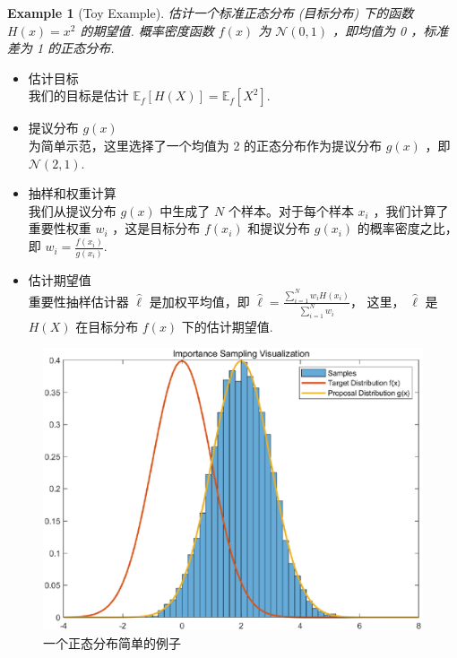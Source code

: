 \documentclass[UTF8,12pt,twoside]{ctexart}
\numberwithin{equation}{section}%
\newtheorem{example}{Example}[section]
\begin{document}
	
	\begin{example}[Toy Example]
		估计一个标准正态分布 (目标分布) 下的函数 $H(x)=x^2$ 的期望值. 概率密度函数 $f(x)$ 为 $\mathcal{N}(0,1)$ ，即均值为 0 ，标准差为 1 的正态分布. 
	\end{example}
	
	
	\begin{itemize}[itemsep=10pt, parsep=5pt]
		\item 估计目标\\
			我们的目标是估计 $\mathbb{E}_f[H(X)]=\mathbb{E}_f\left[X^2\right]$.
		\item 提议分布 $g(x)$\\
		为简单示范，这里选择了一个均值为 2 的正态分布作为提议分布 $g(x)$ ，即 $\mathcal{N}(2,1)$.
		\item 抽样和权重计算\\
		我们从提议分布 $g(x)$ 中生成了 $N$ 个样本。对于每个样本 $x_i$ ，我们计算了重要性权重 $w_i$ ，这是目标分布 $f\left(x_i\right)$ 和提议分布 $g\left(x_i\right)$ 的概率密度之比，即 $w_i=\frac{f\left(x_i\right)}{g\left(x_i\right)}$.
		\item 估计期望值\\
		重要性抽样估计器 $\hat{\ell}$ 是加权平均值，即
		$
		\hat{\ell}=\frac{\sum_{i=1}^N w_i H\left(x_i\right)}{\sum_{i=1}^N w_i}
		$，
		这里， $\hat{\ell}$ 是 $H(X)$ 在目标分布 $f(x)$ 下的估计期望值.
	\end{itemize}
	
	\begin{figure}[H]
		\centering
		\includegraphics[width=0.8\linewidth]{Toy example.eps} %
		\caption{一个正态分布简单的例子}
		\label{fig:Toy example} %
	\end{figure}
	
	
	
	\newpage
	
\end{document}
